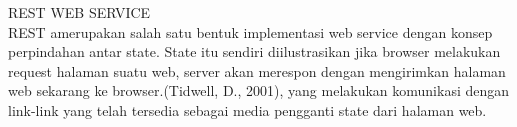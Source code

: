 \documentclass[12pt, times new roman, a4paper, justify]{article}
\begin{document}
\noindent REST WEB SERVICE\\
	REST amerupakan salah satu bentuk implementasi web service  dengan konsep perpindahan antar state. State itu sendiri diilustrasikan jika browser melakukan request halaman suatu web, server akan merespon dengan mengirimkan halaman web sekarang ke browser.(Tidwell, D., 2001), yang melakukan komunikasi dengan link-link yang telah tersedia sebagai media pengganti state dari halaman web.  
\end{document}
